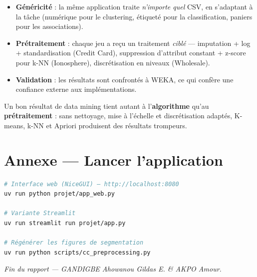\documentclass[11pt,a4paper]{article}
\begin{document}
\begin{itemize}[leftmargin=*]
  \item \textbf{Généricité} : la même application traite \emph{n'importe quel}
        CSV, en s'adaptant à la tâche (numérique pour le clustering, étiqueté pour
        la classification, paniers pour les associations).
  \item \textbf{Prétraitement} : chaque jeu a reçu un traitement \emph{ciblé} ---
        imputation + log + standardisation (Credit Card), suppression d'attribut
        constant + z-score pour k-NN (Ionosphere), discrétisation en niveaux
        (Wholesale).
  \item \textbf{Validation} : les résultats sont confrontés à WEKA, ce qui confère
        une confiance externe aux implémentations.
\end{itemize}

\begin{tcolorbox}[colback=dmgreen!5, colframe=dmgreen, title=\textbf{À retenir}]
Un bon résultat de data mining tient autant à l'\textbf{algorithme} qu'au
\textbf{prétraitement} : sans nettoyage, mise à l'échelle et discrétisation
adaptés, K-means, k-NN et Apriori produisent des résultats trompeurs.
\end{tcolorbox}

\section*{Annexe --- Lancer l'application}

\begin{lstlisting}[language=bash, caption={Commandes}]
# Interface web (NiceGUI) — http://localhost:8080
uv run python projet/app_web.py

# Variante Streamlit
uv run streamlit run projet/app.py

# Régénérer les figures de segmentation
uv run python scripts/cc_preprocessing.py
\end{lstlisting}

\vfill
\begin{center}\itshape
Fin du rapport --- GANDIGBE Ahowanou Gildas E. \& AKPO Amour.
\end{center}
\end{document}
